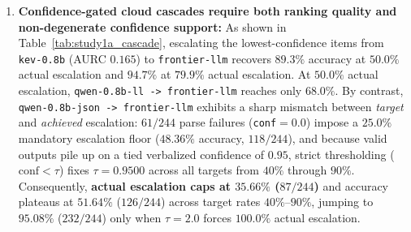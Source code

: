 \documentclass[11pt,a4paper]{article}
\begin{document}
\begin{enumerate}[leftmargin=1.5em,itemsep=2pt]
  \item \textbf{Confidence-gated cloud cascades require both ranking quality and non-degenerate confidence support:} As shown in Table~\ref{tab:study1a_cascade}, escalating the lowest-confidence items from \texttt{kev-0.8b} (AURC $0.165$) to \texttt{frontier-llm} recovers $89.3\%$ accuracy at $50.0\%$ actual escalation and $94.7\%$ at $79.9\%$ actual escalation. At $50.0\%$ actual escalation, \texttt{qwen-0.8b-ll -> frontier-llm} reaches only $68.0\%$. By contrast, \texttt{qwen-0.8b-json -> frontier-llm} exhibits a sharp mismatch between \emph{target} and \emph{achieved} escalation: $61/244$ parse failures (\texttt{conf}$=0.0$) impose a $25.0\%$ mandatory escalation floor ($48.36\%$ accuracy, $118/244$), and because valid outputs pile up on a tied verbalized confidence of $0.95$, strict thresholding ($\text{conf} < \tau$) fixes $\tau = 0.9500$ across all targets from $40\%$ through $90\%$. Consequently, \textbf{actual escalation caps at $35.66\%$ ($87/244$)} and accuracy plateaus at $51.64\%$ ($126/244$) across target rates $40\%$--$90\%$, jumping to $95.08\%$ ($232/244$) only when $\tau=2.0$ forces $100.0\%$ actual escalation.
\end{enumerate}

\begin{table}[t]
\centering
\caption{Study~1A: Confidence-gated cloud cascades on \texttt{full\_benchmark\_v2} ($N=244$), distinguishing target escalation from actual achieved escalation under strict $\text{conf} < \tau$ routing. For \texttt{qwen-0.8b-json}, tied verbalized confidence ($0.95$) caps actual escalation at $35.66\%$ ($87/244$) for targets $40\%$--$90\%$.}
\label{tab:study1a_cascade}
\end{table}
\end{document}
